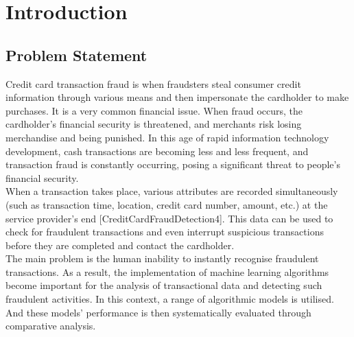 %
%
\chapter{Introduction} %



\section{Problem Statement}
Credit card transaction fraud is when fraudsters steal consumer credit information through various means and then impersonate the cardholder to make purchases. It is a very common financial issue. When fraud occurs, the cardholder's financial security is threatened, and merchants risk losing merchandise and being punished. In this age of rapid information technology development, cash transactions are becoming less and less frequent, and transaction fraud is constantly occurring, posing a significant threat to people's financial security.\\
\vspace{12pt}
When a transaction takes place, various attributes are recorded simultaneously (such as transaction time, location, credit card number, amount, etc.) at the service provider's end [CreditCardFraudDetection4]. This data can be used to check for fraudulent transactions and even interrupt suspicious transactions before they are completed and contact the cardholder.\\
\vspace{12pt}
The main problem is the human inability to instantly recognise fraudulent transactions. As a result, the implementation of machine learning algorithms become important for the analysis of transactional data and detecting such fraudulent activities. In this context, a range of algorithmic models is utilised. And these models' performance is then systematically evaluated through comparative analysis.

